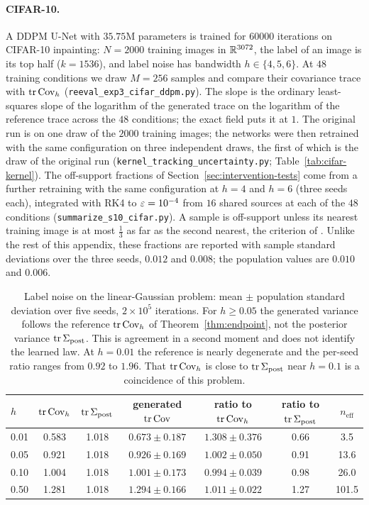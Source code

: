 \documentclass{article} %
\theoremstyle{plain}
\theoremstyle{definition}
\theoremstyle{remark}
\begin{document}
\paragraph{CIFAR-10.} A DDPM U-Net with $35.75$M parameters is trained for $60000$ iterations on
CIFAR-10 inpainting: $N=2000$ training images in $\mathbb{R}^{3072}$, the label of an image is its top
half ($k=1536$), and label noise has bandwidth $h\in\{4,5,6\}$. At $48$ training conditions we draw
$M=256$ samples and compare their covariance trace with $\operatorname{tr}\operatorname{Cov}_h$
(\texttt{reeval\_exp3\_cifar\_ddpm.py}). The slope is the ordinary least-squares slope of the
logarithm of the generated trace on the logarithm of the reference trace across the $48$
conditions; the exact field puts it at $1$. The original run is on one draw of the $2000$ training
images; the networks were then retrained with the same configuration on three independent draws,
the first of which is the draw of the original run (\texttt{kernel\_tracking\_uncertainty.py};
Table~\ref{tab:cifar-kernel}). The off-support fractions of Section~\ref{sec:intervention-tests} come
from a further retraining with the same configuration at $h=4$ and $h=6$ (three seeds each),
integrated with RK4 to $\varepsilon=10^{-4}$ from $16$ shared sources at each of the $48$ conditions
(\texttt{summarize\_s10\_cifar.py}). A sample is off-support unless its nearest training image is at
most $\tfrac13$ as far as the second nearest, the criterion of \citet{yoon2023memorization}. Unlike
the rest of this appendix, these fractions are reported with sample standard deviations over the
three seeds, $0.012$ and $0.008$; the population values are $0.010$ and $0.006$.

\begin{table}[htb]
\centering\small
\begin{tabular}{lcccccc}
\toprule
$h$ & $\operatorname{tr}\operatorname{Cov}_h$ & $\operatorname{tr}\Sigma_{\mathrm{post}}$ & generated $\operatorname{tr}\operatorname{Cov}$ & ratio to $\operatorname{tr}\operatorname{Cov}_h$ & ratio to $\operatorname{tr}\Sigma_{\mathrm{post}}$ & $n_{\mathrm{eff}}$\\
\midrule
0.01 & 0.583 & 1.018 & $0.673\pm0.187$ & $1.308\pm0.376$ & 0.66 & 3.5\\
0.05 & 0.921 & 1.018 & $0.926\pm0.169$ & $1.002\pm0.050$ & 0.91 & 13.6\\
0.10 & 1.004 & 1.018 & $1.001\pm0.173$ & $0.994\pm0.039$ & 0.98 & 26.0\\
0.50 & 1.281 & 1.018 & $1.294\pm0.166$ & $1.011\pm0.022$ & 1.27 & 101.5\\
\bottomrule
\end{tabular}
\caption{Label noise on the linear-Gaussian problem: mean $\pm$ population standard deviation
over five seeds, $2\times10^5$ iterations. For $h\ge0.05$ the generated variance follows the
reference $\operatorname{tr}\operatorname{Cov}_h$ of Theorem~\ref{thm:endpoint}, not the posterior variance $\operatorname{tr}\Sigma_{\mathrm{post}}$. This
is agreement in a second moment and does not identify the learned law. At $h=0.01$ the reference
is nearly degenerate and the per-seed ratio ranges from $0.92$ to $1.96$. That $\operatorname{tr}\operatorname{Cov}_h$ is close
to $\operatorname{tr}\Sigma_{\mathrm{post}}$ near $h=0.1$ is a coincidence of this problem.}
\label{tab:p7kernel}
\end{table}
\end{document}
